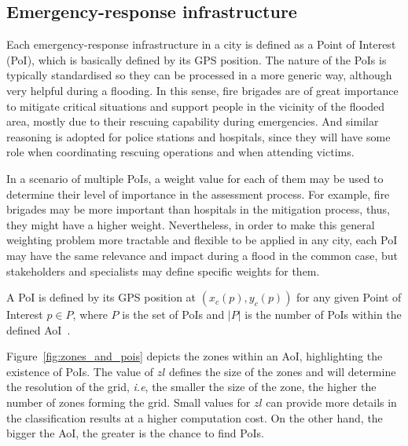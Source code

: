 \begin{refsection}
\subsection{Emergency-response infrastructure}

Each emergency-response infrastructure in a city is defined as a Point of Interest (PoI), which is basically defined by its GPS position. The nature of the PoIs is typically standardised so they can be processed in a more generic way, although very helpful during a flooding. In this sense, fire brigades are of great importance to mitigate critical situations and support people in the vicinity of the flooded area, mostly due to their rescuing capability during emergencies. And similar reasoning is adopted for police stations and hospitals, since they will have some role when coordinating rescuing operations and when attending victims.

In a scenario of multiple PoIs, a weight value for each of them may be used to determine their level of importance in the assessment process. For example, fire brigades may be more important than hospitals in the mitigation process, thus, they might have a higher weight. Nevertheless, in order to make this general weighting problem more tractable and flexible to be applied in any city, each PoI may have the same relevance and impact during a flood in the common case, but stakeholders and specialists may define specific weights for them.

A PoI is defined by its GPS position at $(x_c(p), y_c(p))$ for any given Point of Interest $p \in P$, where $P$ is the set of PoIs and $|P|$ is the number of PoIs within the defined AoI~\cite{sensorsposition}.

Figure~\ref{fig:zones_and_pois} depicts the zones within an AoI, highlighting the existence of PoIs. The value of $zl$ defines the size of the zones and will determine the resolution of the grid, \textit{i.e}, the smaller the size of the zone, the higher the number of zones forming the grid. Small values for $zl$ can provide more details in the classification results at a higher computation cost. On the other hand, the bigger the AoI, the greater is the chance to find PoIs.


\end{refsection}
